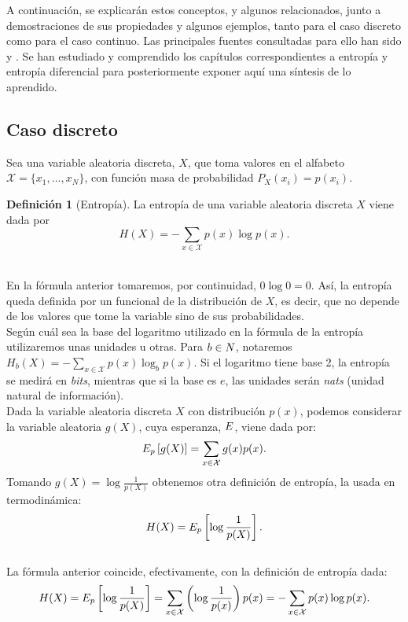 \documentclass[12pt,a4paper]{report} %
\let\mathbb\relax
\theoremstyle{definition}
\newtheorem{definition}{Definición}[section]
\begin{document}
A continuación, se explicarán estos conceptos, y algunos relacionados, junto a demostraciones de sus propiedades y algunos ejemplos, tanto para el caso discreto como para el caso continuo. Las principales fuentes consultadas para ello han sido \cite{thomas} y \cite{gray}. Se han estudiado y comprendido los capítulos correspondientes a entropía y entropía diferencial para posteriormente exponer aquí una síntesis de lo aprendido.\\

\subsection{Caso discreto}
    
Sea una variable aleatoria discreta, $X$, que toma valores en el alfabeto $\mathcal{X} = \{x_1, \dots, x_N \}$, con función masa de probabilidad $P_X(x_i) = p(x_i)$.\\

\begin{definition}[Entropía]
  La entropía de una variable aleatoria discreta $X$ viene dada por \[H(X) = - \sum_{x\in \mathcal{X}} p(x) \log p(x).\]\\[-15pt]
\end{definition}

En la fórmula anterior tomaremos, por continuidad, $0 \log 0 = 0$. Así, la entropía queda definida por un funcional de la distribución de $X$, es decir, que no depende de los valores que tome la variable sino de sus probabilidades.\\

Según cuál sea la base del logaritmo utilizado en la fórmula de la entropía utilizaremos unas unidades u otras. Para $b\in \mathbb{N}$, notaremos $H_b(X) = - \sum_{x\in \mathcal{X}} p(x) \log_b p(x)$. Si el logaritmo tiene base 2, la entropía se medirá en \textit{bits}, mientras que si la base es $e$, las unidades serán \textit{nats} (unidad natural de información).\\

Dada la variable aleatoria discreta $X$ con distribución $p(x)$, podemos considerar la variable aleatoria $g(X)$, cuya esperanza, $\E$, viene dada por:\[
\E_p\left[g(X)\right] = \sum_{x\in \mathcal{X}}g(x)p(x).
\]
Tomando $g(X) = \log \frac{1}{p(X)}$ obtenemos otra definición de entropía, la usada en termodinámica:\[
H(X) = \E_p \left[\log \frac{1}{p(X)}\right].
\]\\[-10pt]

La fórmula anterior coincide, efectivamente, con la definición de entropía dada:\[
H(X) = \E_p \left[\log \frac{1}{p(X)}\right] = \sum_{x\in \mathcal{X}}\left ( \log \frac{1}{p(x)} \right ) p(x) = - \sum_{x \in \mathcal{X}}p(x)\log p(x).
\]\\[-10pt]
\end{document}
